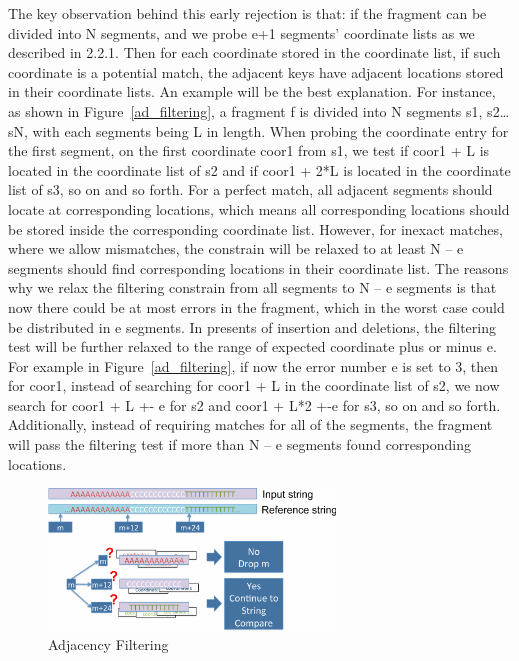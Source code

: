 The key observation behind this early rejection is that: if the fragment can be
divided into N segments, and we probe e+1 segments’ coordinate lists as we
described in 2.2.1. Then for each coordinate stored in the coordinate list, if
such coordinate is a potential match, the adjacent keys have adjacent locations
stored in their coordinate lists. An example will be the best explanation. For
instance, as shown in Figure~\ref{ad_filtering}, a fragment f is divided into
N segments s1, s2… sN, with each segments being L in length. When probing the
coordinate entry for the first segment, on the first coordinate coor1 from s1,
we test if coor1 + L is located in the coordinate list of s2 and if coor1 + 2*L
is located in the coordinate list of s3, so on and so forth. For a perfect
match, all adjacent segments should locate at corresponding locations, which
means all corresponding locations should be stored inside the corresponding
coordinate list. However, for inexact matches, where we allow mismatches, the
constrain will be relaxed to at least N – e segments should find corresponding
locations in their coordinate list. The reasons why we relax the filtering
constrain from all segments to N – e segments is that now there could be at
most errors in the fragment, which in the worst case could be distributed in e
segments. In presents of insertion and deletions, the filtering test will be
further relaxed to the range of expected coordinate plus or minus e. For
example in Figure~\ref{ad_filtering}, if now the error number e is set to 3,
then for coor1, instead of searching for coor1 + L in the coordinate list of
s2, we now search for coor1 + L +- e for s2 and coor1 + L*2 +-e for s3, so on
and so forth.  Additionally, instead of requiring matches for all of the
segments, the fragment will pass the filtering test if more than N – e segments
found corresponding locations. \\

\begin{figure}[t] 
\centering
\vspace{0.1in}
\includegraphics[width=3in]{./figure/Adjacency_Filtering_B.pdf} \vspace{0in}
\caption{Adjacency Filtering}
\label{fig:ad_filtering} 
\end{figure}

